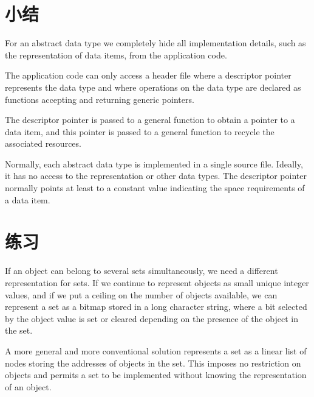 \section{小结}
For an abstract data type we completely hide all implementation details,
such as the representation of data items, from the application code.

The application code can only access a header file where a descriptor
pointer represents the data type and where operations on the data type are
declared as functions accepting and returning generic pointers.

The descriptor pointer is passed to a general function  to
obtain a pointer to a data item, and this pointer is passed to a general
function  to recycle the associated resources.

Normally, each abstract data type is implemented in a single source file.
Ideally, it has no access to the representation or other data types. The
descriptor pointer normally points at least to a constant 
value indicating the space requirements of a data item.

\section{练习}
If an object can belong to several sets simultaneously, we need a different
representation for sets. If we continue to represent objects as small unique
integer values, and if we put a ceiling on the number of objects available,
we can represent a set as a bitmap stored in a long character string, where
a bit selected by the object value is set or cleared depending on the
presence of the object in the set.

A more general and more conventional solution represents a set as a linear
list of nodes storing the addresses of objects in the set. This imposes no
restriction on objects and permits a set to be implemented without knowing
the representation of an object.

